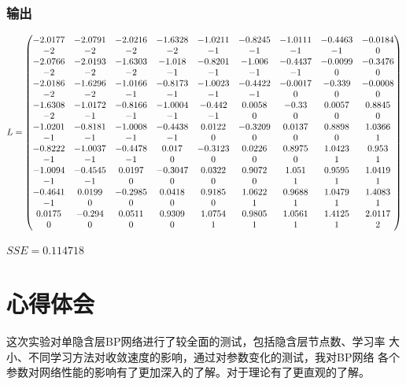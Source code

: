 \documentclass[UTF8]{article}
\begin{document}
\subsubsection{输出}
\begin{equation}
\begin{aligned}
L = 
\left(
\addtocounter{MaxMatrixCols}{27}
\begin{matrix}
    -2.0177&-2.0791&-2.0216&-1.6328&-1.0211&-0.8245&-1.0111&-0.4463&-0.0184\\
    -2&-2&-2&-2&-1&-1&-1&-1&0\\
    -2.0766&-2.0193&-1.6303&-1.018&-0.8201&-1.006&-0.4437&-0.0099&-0.3476\\
    -2&-2&-2&-1&-1&-1&-1&0&0\\
    -2.0186&-1.6296&-1.0166&-0.8173&-1.0023&-0.4422&-0.0017&-0.339&-0.0008\\
    -2&-2&-1&-1&-1&-1&0&0&0\\
    -1.6308&-1.0172&-0.8166&-1.0004&-0.442&0.0058&-0.33&0.0057&0.8845\\
    -2&-1&-1&-1&-1&0&0&0&0\\
    -1.0201&-0.8181&-1.0008&-0.4438&0.0122&-0.3209&0.0137&0.8898&1.0366\\
    -1&-1&-1&-1&0&0&0&0&1\\
    -0.8222&-1.0037&-0.4478&0.017&-0.3123&0.0226&0.8975&1.0423&0.953\\
    -1&-1&-1&0&0&0&0&1&1\\
    -1.0094&-0.4545&0.0197&-0.3047&0.0322&0.9072&1.051&0.9595&1.0419\\
    -1&-1&0&0&0&0&1&1&1\\
    -0.4641&0.0199&-0.2985&0.0418&0.9185&1.0622&0.9688&1.0479&1.4083\\
    -1&0&0&0&0&1&1&1&1\\
    0.0175&-0.294&0.0511&0.9309&1.0754&0.9805&1.0561&1.4125&2.0117\\
    0&0&0&0&1&1&1&1&2
\end{matrix}
\right) \nonumber
\end{aligned}
\end{equation}
\begin{center}
$SSE = 0.114718$
\end{center}

\section{心得体会}
这次实验对单隐含层BP网络进行了较全面的测试，包括隐含层节点数、学习率
大小、不同学习方法对收敛速度的影响，通过对参数变化的测试，我对BP网络
各个参数对网络性能的影响有了更加深入的了解。对于理论有了更直观的了解。
\end{document}
